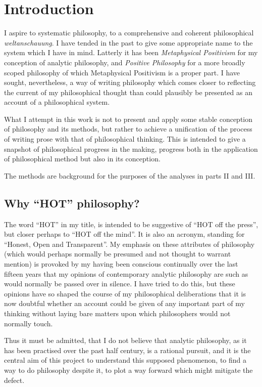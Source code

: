 \appendix

\chapter{Introduction}

I aspire to systematic philosophy, to a comprehensive and coherent philosophical \emph{weltanschauung}.
I have tended in the past to give some appropriate name to the system which I have in mind.
Latterly it has been {\it Metaphysical Positivism} for my conception of analytic philosophy, and {\it Positive Philosophy} for a more broadly scoped philosophy of which Metaphysical Positivism is a proper part.
I have sought, nevertheless, a way of writing philosophy which comes closer to reflecting the current of my philosophical thought than could plausibly be presented as an account of a philosophical system.

What I attempt in this work is not to present and apply some stable conception of philosophy and its methods, but rather to achieve a unification of the process of writing prose with that of philosophical thinking.
This is intended to give a snapshot of philosophical progress in the making, progress both in the application of philosophical method but also in its conception.

The methods are background for the purposes of the analyses in parts II and III.

\section{Why ``HOT'' philosophy?}

The word ``HOT'' in my title, is intended to be suggestive of ``HOT off the press'', but closer perhaps to ``HOT off the mind''.
It is also an acronym, standing for ``Honest, Open and Transparent''.
My emphasis on these attributes of philosophy (which would perhaps normally be presumed and not thought to warrant mention) is provoked by my having been conscious continually over the last fifteen years that my opinions of contemporary analytic philosophy are such as would normally be passed over in silence.
I have tried to do this, but these opinions have so shaped the course of my philosophical deliberations that it is now doubtful whether an account could be given of any important part of my thinking without laying bare matters upon which philosophers would not normally touch.

Thus it must be admitted, that I do not believe that analytic philosophy, as it has been practised over the past half century, is a rational pursuit, and it is the central aim of this project to understand this supposed phenomenon, to find a way to do philosophy despite it, to plot a way forward which might mitigate the defect.

